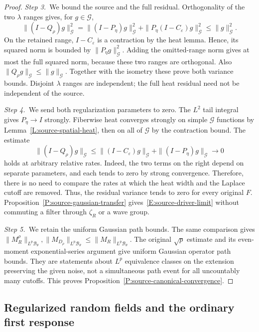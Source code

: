 \begin{proof}
  \medskip
  \noindent\textit{Step 3.~}We bound the source and the full residual.
  Orthogonality of the two $\lambda$ ranges gives, for $g \in \mathcal{G}$,
  \[
    \|(I-Q_\rho)g\|_{\mathcal{G}}^2
    =\|(I-P_\eta)g\|_{\mathcal{G}}^2
    +\|P_\eta(I-C_\varepsilon)g\|_{\mathcal{G}}^2
    \le\|g\|_{\mathcal{G}}^2.
  \]
  On the retained range, $I-C_\varepsilon$ is a contraction by the heat lemma.
  Hence, its squared norm is bounded by $\|P_\eta g\|_{\mathcal G}^2$. Adding
  the omitted-range norm gives at most the full squared norm, because these
  two ranges are orthogonal.
  Also $\|Q_\rho g\|_{\mathcal{G}} \le \|g\|_{\mathcal{G}}$. Together with the
  isometry these prove both variance bounds. Disjoint $\lambda$ ranges are
  independent; the full heat residual need not be independent of the source.

  \medskip
  \noindent\textit{Step 4.~}We send both regularization parameters to zero.
  The $L^2$ tail integral gives $P_\eta \to I$ strongly. Fiberwise heat
  converges strongly on simple $\mathcal{G}$ functions by
  Lemma~\ref{L:source-spatial-heat}, then on all of $\mathcal{G}$ by the
  contraction bound. The estimate
  \[
    \|(I-Q_\rho)g\|_{\mathcal{G}}
    \le\|(I-C_\varepsilon)g\|_{\mathcal{G}}
    +\|(I-P_\eta)g\|_{\mathcal{G}}\longrightarrow0
  \]
  holds at arbitrary relative rates.
  Indeed, the two terms on the right depend on separate parameters, and each
  tends to zero by strong convergence. Therefore, there is no need to compare
  the rates at which the heat width and the Laplace cutoff are removed.
  Thus, the residual variance tends to zero
  for every original $F$. Proposition~\ref{P:source-gaussian-transfer}
  gives~\eqref{E:source-driver-limit} without commuting a filter through
  $\zeta_R$ or a wave group.

  \medskip
  \noindent\textit{Step 5.~}We retain the uniform Gaussian path bounds.
  The same comparison gives $\|M_R^\rho\|_{L^p\mathscr{B}_\theta},
  \|M_{D_\rho}\|_{L^p\mathscr{B}_\theta} \le \|M_R\|_{L^p\mathscr{B}_\theta}$.
  The original $\sqrt p$ estimate and its even-moment exponential-series
  argument give uniform Gaussian operator path bounds. They are statements about
  $L^p$ equivalence classes on the extension preserving the given noise, not a
  simultaneous path event for all uncountably many cutoffs. This proves
  Proposition~\ref{P:source-canonical-convergence}.
\end{proof}

\subsection{Regularized random fields and the ordinary first response}

